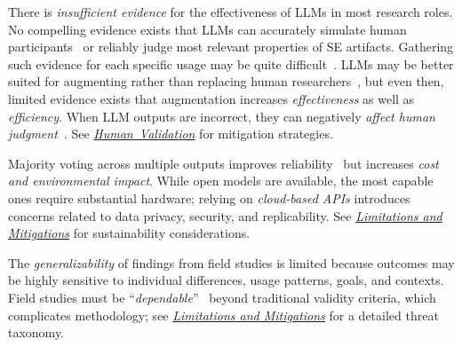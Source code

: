 \documentclass[smallextended]{svjour3}
\newcommand*{\enq}[1]{\enquote{{\itshape#1}}}
\newcommand{\humanvalidation}{\hyperref[sec:use-human-validation-for-llm-outputs]{\mbox{\emph{Human Validation}}}\xspace}
\newcommand{\limitationsmitigations}{\hyperref[sec:report-limitations-and-mitigations]{\emph{Limitations and Mitigations}}\xspace}
\newcommand{\humanvalidation}{\href{/guidelines/human-validation/}{\emph{Human Validation}}\xspace}
\newcommand{\limitationsmitigations}{\href{/guidelines/limitations/}{\emph{Limitations and Mitigations}}\xspace}
\begin{document}
There is \emph{insufficient evidence} for the effectiveness of LLMs in most research roles. No compelling evidence exists that LLMs can accurately simulate human participants~\cite{schroder2026limits} or reliably judge most relevant properties of SE artifacts. Gathering such evidence for each specific usage may be quite difficult~\cite{DBLP:journals/ais/HardingDLL24}. LLMs may be better suited for augmenting rather than replacing human researchers~\cite{DBLP:conf/emnlp/WangLXZZ21, DBLP:conf/chi/HeHDRH24}, but even then, limited evidence exists that augmentation increases \emph{effectiveness} as well as \emph{efficiency}. When LLM outputs are incorrect, they can negatively \emph{affect human judgment}~\cite{DBLP:conf/www/HuangKA23a}. See \humanvalidation for mitigation strategies.

Majority voting across multiple outputs improves reliability~\cite{DBLP:journals/corr/abs-2304-11085} but increases \emph{cost and environmental impact}. While open models are available, the most capable ones require substantial hardware; relying on \emph{cloud-based APIs} introduces concerns related to data privacy, security, and replicability. See \limitationsmitigations for sustainability considerations.

The \emph{generalizability} of findings from field studies is limited because outcomes may be highly sensitive to individual differences, usage patterns, goals, and contexts. Field studies must be \enq{dependable}~\cite{Sullivan2011-ub} beyond traditional validity criteria, which complicates methodology; see \limitationsmitigations for a detailed threat taxonomy.
\space%
\end{document}

